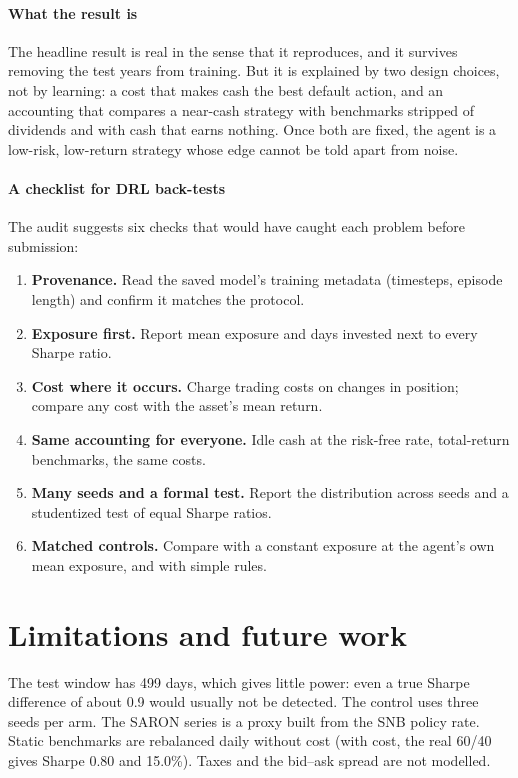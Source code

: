 \documentclass[11pt,a4paper]{article}
\begin{document}
\paragraph{What the result is}
The headline result is real in the sense that it reproduces, and it survives removing the test years from training. But it is explained by two design choices, not by learning: a cost that makes cash the best default action, and an accounting that compares a near-cash strategy with benchmarks stripped of dividends and with cash that earns nothing. Once both are fixed, the agent is a low-risk, low-return strategy whose edge cannot be told apart from noise.

\paragraph{A checklist for DRL back-tests}
The audit suggests six checks that would have caught each problem before submission:
\begin{enumerate}[leftmargin=1.4em]
  \item \textbf{Provenance.} Read the saved model's training metadata (timesteps, episode length) and confirm it matches the protocol.
  \item \textbf{Exposure first.} Report mean exposure and days invested next to every Sharpe ratio.
  \item \textbf{Cost where it occurs.} Charge trading costs on changes in position; compare any cost with the asset's mean return.
  \item \textbf{Same accounting for everyone.} Idle cash at the risk-free rate, total-return benchmarks, the same costs.
  \item \textbf{Many seeds and a formal test.} Report the distribution across seeds and a studentized test of equal Sharpe ratios.
  \item \textbf{Matched controls.} Compare with a constant exposure at the agent's own mean exposure, and with simple rules.
\end{enumerate}

\section{Limitations and future work}

The test window has 499 days, which gives little power: even a true Sharpe difference of about 0.9 would usually not be detected. The control uses three seeds per arm. The SARON series is a proxy built from the SNB policy rate. Static benchmarks are rebalanced daily without cost (with cost, the real 60/40 gives Sharpe 0.80 and 15.0\%). Taxes and the bid--ask spread are not modelled.
\end{document}
